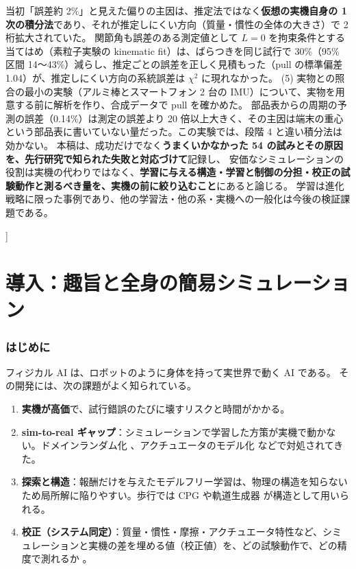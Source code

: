 \documentclass[paper=a4paper,fontsize=10pt,twocolumn,column_gap=2zw,line_length=24zw,number_of_lines=46,head_space=20mm]{jlreq}
\begin{document}
\begin{@twocolumnfalse}
\begin{center}
\begin{minipage}{0.9\textwidth}
当初「誤差約 2\%」と見えた偏りの主因は、推定法ではなく\textbf{仮想の実機自身の 1 次の積分法}であり、それが推定しにくい方向（質量・慣性の全体の大きさ）で 2 桁拡大されていた。
関節角も誤差のある測定値として $L=0$ を拘束条件とする当てはめ（素粒子実験の kinematic fit）は、ばらつきを同じ試行で 30\%（95\% 区間 14〜43\%）減らし、推定ごとの誤差を正しく見積もった（pull の標準偏差 1.04）が、推定しにくい方向の系統誤差は $\chi^2$ に現れなかった。
(5) 実物との照合の最小の実験（アルミ棒とスマートフォン 2 台の IMU）について、実物を用意する前に解析を作り、合成データで pull を確かめた。
部品表からの周期の予測の誤差（0.14\%）は測定の誤差より 20 倍以上大きく、その主因は端末の重心という部品表に書いていない量だった。この実験では、段階 4 と違い積分法は効かない。
本稿は、成功だけでなく\textbf{うまくいかなかった 54 の試みとその原因を、先行研究で知られた失敗と対応づけて}記録し、
安価なシミュレーションの役割は実機の代わりではなく、\textbf{学習に与える構造・学習と制御の分担・校正の試験動作と測るべき量を、実機の前に絞り込むこと}にあると論じる。
学習は進化戦略に限った事例であり、他の学習法・他の系・実機への一般化は今後の検証課題である。
\end{minipage}\end{center}
\vspace{1em}
\end{@twocolumnfalse}
]

\part{導入：趣旨と全身の簡易シミュレーション}

\section{はじめに}\label{sec:intro}

フィジカル AI は、ロボットのように身体を持って実世界で動く AI である。
その開発には、次の課題がよく知られている。
\begin{enumerate}\setlength{\itemsep}{0pt}
\item \textbf{実機が高価}で、試行錯誤のたびに壊すリスクと時間がかかる。
\item \textbf{sim-to-real ギャップ}：シミュレーションで学習した方策が実機で動かない。ドメインランダム化 \cite{tobin2017,peng2018}、アクチュエータのモデル化 \cite{hwangbo2019} などで対処されてきた。
\item \textbf{探索と構造}：報酬だけを与えたモデルフリー学習は、物理の構造を知らないため局所解に陥りやすい。歩行では CPG \cite{ijspeert2008} や軌道生成器 \cite{iscen2018} が構造として用いられる。
\item \textbf{校正（システム同定）}：質量・慣性・摩擦・アクチュエータ特性など、シミュレーションと実機の差を埋める値（校正値）を、どの試験動作で、どの精度で測れるか \cite{atkeson1986,gautier1990}。
\end{enumerate}
\end{document}
